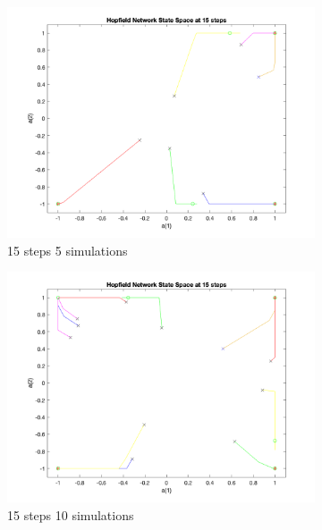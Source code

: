 \documentclass[11pt,conference,compsoc]{IEEEtran}
\begin{document}
\begin{figure}[]

    \begin{subfigure}{0.33\linewidth}
        \includegraphics[width=\linewidth]{images/hopfield1_15steps_5sims.png}
        \caption{15 steps 5 simulations}
    \end{subfigure}
    \begin{subfigure}{0.33\linewidth}
        \includegraphics[width=\linewidth]{images/hopfield1_15steps_10sims.png}
        \caption{15 steps 10 simulations}
    \end{subfigure}
    \begin{subfigure}{0.33\linewidth}

\end{subfigure}
\end{figure}
\end{document}
